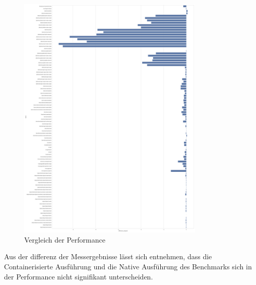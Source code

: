 \begin{figure}[h!]
    \centering
    \includegraphics[width=0.8\textwidth]{benchmark/vis/differences/difference_elapsed.png}
    \caption{Vergleich der Performance}
    \label{fig:comparison}
\end{figure}

Aus der differenz der Messergebnisse lässt sich entnehmen, dass die Containerisierte Ausführung und die Native Ausführung des Benchmarks sich in der Performance nicht signifikant unterscheiden. 

\FloatBarrier




